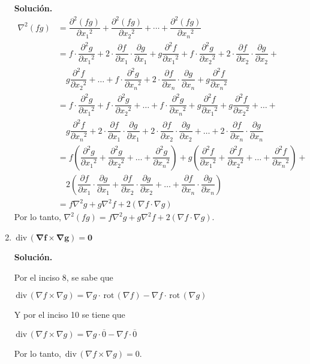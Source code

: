 \documentclass[fleqn, 12pt]{article}
\newcommand{\derivadaparcial}[2]{\dfrac{\partial {#1}}{\partial {#2}}}
\newcommand{\derivadaparcialn}[3]{\dfrac{\partial^{#3} {#1}}{\partial {#2}^{#3}}}
\newcommand{\rot}{\mathrm{\, rot \,}}
\newcommand{\dive}{\mathrm{\, div \,}}
\begin{document}
\begin{enumerate}
        \textbf{Solución.}
        \begin{align*}
            \nabla^2 (fg) &= \derivadaparcialn{(fg)}{x_1}{2} + \derivadaparcialn{(fg)}{x_2}{2} + \cdots + \derivadaparcialn{(fg)}{x_n}{2} \\
            &= f \cdot \derivadaparcialn{g}{x_1}{2} + 2 \cdot \derivadaparcial{f}{x_1} \cdot \derivadaparcial{g}{x_1} + g \derivadaparcialn{f}{x_1}{2} + f \cdot \derivadaparcialn{g}{x_2}{2} + 2 \cdot \derivadaparcial{f}{x_2} \cdot \derivadaparcial{g}{x_2} + \\
            & \quad g \derivadaparcialn{f}{x_2}{2} + \ldots + f \cdot \derivadaparcialn{g}{x_n}{2} + 2 \cdot \derivadaparcial{f}{x_n} \cdot \derivadaparcial{g}{x_n} + g \derivadaparcialn{f}{x_n}{2} \\
            &= f \cdot \derivadaparcialn{g}{x_1}{2} + f \cdot \derivadaparcialn{g}{x_2}{2} + \ldots + f \cdot \derivadaparcialn{g}{x_n}{2} + g \derivadaparcialn{f}{x_1}{2} + g \derivadaparcialn{f}{x_2}{2} + \ldots + \\
            & \quad g \derivadaparcialn{f}{x_n}{2} + 2 \cdot \derivadaparcial{f}{x_1} \cdot \derivadaparcial{g}{x_1} + 2 \cdot \derivadaparcial{f}{x_2} \cdot \derivadaparcial{g}{x_2} + \ldots + 2 \cdot \derivadaparcial{f}{x_n} \cdot \derivadaparcial{g}{x_n} \\
            &= f \left( \derivadaparcialn{g}{x_1}{2} + \derivadaparcialn{g}{x_2}{2} + \ldots + \derivadaparcialn{g}{x_n}{2} \right) + g \left( \derivadaparcialn{f}{x_1}{2} + \derivadaparcialn{f}{x_2}{2} + \ldots + \derivadaparcialn{f}{x_n}{2} \right) + \\
            & \quad 2 \left( \derivadaparcial{f}{x_1} \cdot \derivadaparcial{g}{x_1} + \derivadaparcial{f}{x_2} \cdot \derivadaparcial{g}{x_2} + \ldots + \derivadaparcial{f}{x_n} \cdot \derivadaparcial{g}{x_n} \right) \\
            &= f \nabla^2 g + g \nabla^2 f + 2(\nabla f \cdot \nabla g)
        \end{align*}
        Por lo tanto, $ \nabla^2 (fg) = f \nabla^2 g + g \nabla^2 f + 2(\nabla f \cdot \nabla g) $. \\

        \item $ \mathbf{\dive (\nabla f \times \nabla g) = 0} $
        
        \textbf{Solución.}

        Por el inciso 8, se sabe que

        $ \dive (\nabla f \times \nabla g) = \nabla g \cdot \rot (\nabla f) - \nabla f \cdot \rot (\nabla g) $

        Y por el inciso 10 se tiene que

        $ \dive (\nabla f \times \nabla g) = \nabla g \cdot \overline{0} - \nabla f \cdot \overline{0} $

        Por lo tanto, $ \dive (\nabla f \times \nabla g) = 0 $.
    \end{enumerate}
\end{document}
